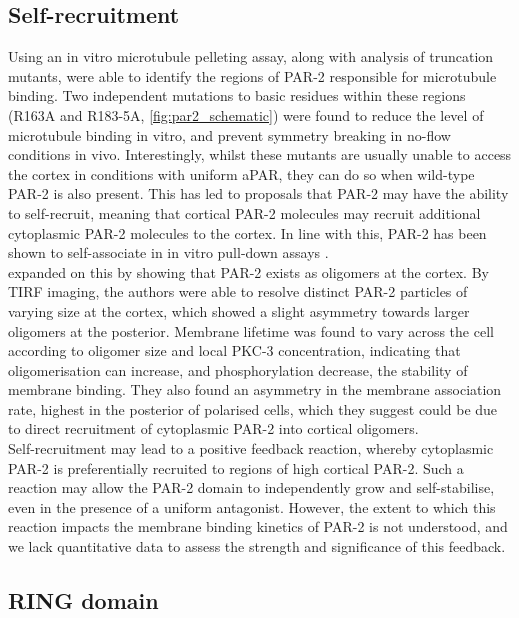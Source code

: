 \documentclass[12pt]{"report"}
\begin{document}
\subsection{Self-recruitment}

Using an in vitro microtubule pelleting assay, along with analysis of truncation mutants, \textcite{Motegi2011} were able to identify the regions of PAR-2 responsible for microtubule binding. Two independent mutations to basic residues within these regions (R163A and R183-5A, \ref{fig:par2_schematic}) were found to reduce the level of microtubule binding in vitro, and prevent symmetry breaking in no-flow conditions in vivo. Interestingly, whilst these mutants are usually unable to access the cortex in conditions with uniform aPAR, they can do so when wild-type PAR-2 is also present. This has led to proposals that PAR-2 may have the ability to self-recruit, meaning that cortical PAR-2 molecules may recruit additional cytoplasmic PAR-2 molecules to the cortex. In line with this, PAR-2 has been shown to self-associate in in vitro pull-down assays \citep{Motegi2011, Arata2016}.\\

\textcite{Arata2016} expanded on this by showing that PAR-2 exists as oligomers at the cortex. By TIRF imaging, the authors were able to resolve distinct PAR-2 particles of varying size at the cortex, which showed a slight asymmetry towards larger oligomers at the posterior. Membrane lifetime was found to vary across the cell according to oligomer size and local PKC-3 concentration, indicating that oligomerisation can increase, and phosphorylation decrease, the stability of membrane binding. They also found an asymmetry in the membrane association rate, highest in the posterior of polarised cells, which they suggest could be due to direct recruitment of cytoplasmic PAR-2 into cortical oligomers.\\

Self-recruitment may lead to a positive feedback reaction, whereby cytoplasmic PAR-2 is preferentially recruited to regions of high cortical PAR-2. Such a reaction may allow the PAR-2 domain to independently grow and self-stabilise, even in the presence of a uniform antagonist. However, the extent to which this reaction impacts the membrane binding kinetics of PAR-2 is not understood, and we lack quantitative data to assess the strength and significance of this feedback. \\


\subsection{RING domain}
\end{document}
